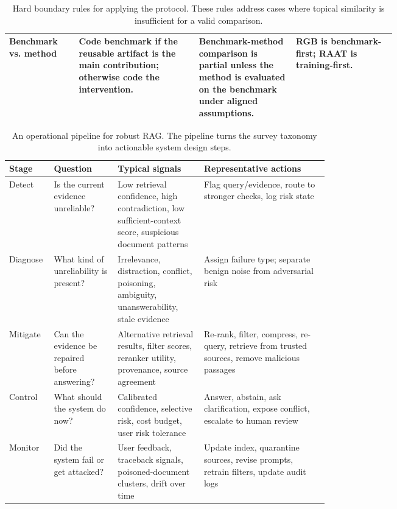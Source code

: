 \documentclass[11pt]{article}
\begin{document}
\begin{table}[t]
\begin{tabularx}{\linewidth}{>{\raggedright\arraybackslash}p{0.18\linewidth}>{\raggedright\arraybackslash}p{0.31\linewidth}>{\raggedright\arraybackslash}p{0.25\linewidth}X}
Benchmark vs. method & Code benchmark if the reusable artifact is the main contribution; otherwise code the intervention. & Benchmark-method comparison is partial unless the method is evaluated on the benchmark under aligned assumptions. & RGB is benchmark-first; RAAT is training-first. \\
\bottomrule
\end{tabularx}
\caption{Hard boundary rules for applying the protocol. These rules address cases where topical similarity is insufficient for a valid comparison.}
\label{tab:taxonomy-rules}
\end{table}


\begin{table}[t]
\centering
\small
\begin{tabularx}{\linewidth}{p{0.14\linewidth}p{0.2\linewidth}p{0.27\linewidth}X}
\toprule
\textbf{Stage} & \textbf{Question} & \textbf{Typical signals} & \textbf{Representative actions} \\
\midrule
Detect & Is the current evidence unreliable? & Low retrieval confidence, high contradiction, low sufficient-context score, suspicious document patterns & Flag query/evidence, route to stronger checks, log risk state \\
Diagnose & What kind of unreliability is present? & Irrelevance, distraction, conflict, poisoning, ambiguity, unanswerability, stale evidence & Assign failure type; separate benign noise from adversarial risk \\
Mitigate & Can the evidence be repaired before answering? & Alternative retrieval results, filter scores, reranker utility, provenance, source agreement & Re-rank, filter, compress, re-query, retrieve from trusted sources, remove malicious passages \\
Control & What should the system do now? & Calibrated confidence, selective risk, cost budget, user risk tolerance & Answer, abstain, ask clarification, expose conflict, escalate to human review \\
Monitor & Did the system fail or get attacked? & User feedback, traceback signals, poisoned-document clusters, drift over time & Update index, quarantine sources, revise prompts, retrain filters, update audit logs \\
\bottomrule
\end{tabularx}
\caption{An operational pipeline for robust RAG. The pipeline turns the survey taxonomy into actionable system design steps.}
\label{tab:operational-pipeline}
\end{table}
\end{document}
